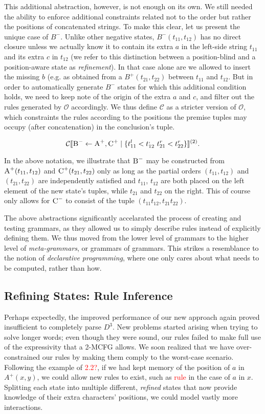 \documentclass[nonatbib,numbers,10pt]{sigplanconf}
\newcommand\todo[1]{\textcolor{red}{#1}}
\newcommand{\Order}[5]{
	\[
	\mathcal{#1}\llbracket #2 \leftarrow #3 \mid \{ #4 \} \rrbracket^{(#5)}.
	\]
}
\newcommand{\Con}[4]{\Order{C}{#1}{#2}{#3}{#4}}
\begin{document}
This additional abstraction, however, is not enough on its own. We still needed the ability to enforce additional constraints related not to the order but rather the positions of concatenated strings. To make this clear, let us present the unique case of $B^{-}$. Unlike other negative states, $B^{-}(t_{11},t_{12})$ has no direct closure unless we actually know it to contain its extra $a$ in the left-side string $t_{11}$ and its extra $c$ in $t_{12}$ (we refer to this distinction between a position-blind and a position-aware state as \textit{refinement}). In that case alone are we allowed to insert the missing $b$ (e.g. as obtained from a $B^{+}(t_{21},t_{22})$ between $t_{11}$ and $t_{12}$. But in order to automatically generate $B^{-}$ states for which this additional condition holds, we need to keep note of the origin of the extra $a$ and $c$, and filter out the rules generated by $\mathcal{O}$ accordingly. We thus define $\mathcal{C}$ as a stricter version of $\mathcal{O}$, which constraints the rules according to the positions the premise tuples may occupy (after concatenation) in the conclusion's tuple.
\Con{\textsc{B}^-}{\textsc{A}^+, \textsc{C}^+}{t_{11}^l < t_{12}^,\ t_{21}^r < t_{22}^r}{2}
In the above notation, we illustrate that $\textsc{B}^{-}$ may be constructed from $\textsc{A}^{+}(t_{11},t_{12})$ and $\textsc{C}^{+}(t_{21},t_{22})$ only as long as the partial orders $(t_{11},t_{12})$ and $(t_{21},t_{22})$ are independently satisfied and $t_{11}$, $t_{12}$ are both placed on the left element of the new state's tuples, while $t_{21}$ and $t_{22}$ on the right. This of course only allows for $\textsc{C}^{-}$ to consist of the tuple $(t_{11}t_{12}, t_{21}t_{22})$.

The above abstractions significantly accelarated the process of creating and testing grammars, as they allowed us to simply describe rules instead of explicitly defining them. We thus moved from the lower level of grammars to the higher level of \textit{meta-grammars}, or grammars of grammars. This strikes a resemblance to the notion of \textit{declarative programming}, where one only cares about what needs to be computed, rather than how.

\subsection{Refining States: Rule Inference}
Perhaps expectedly, the improved performance of our new approach again proved insufficient to completely parse $D^3$. New problems started arising when trying to solve longer words; even though they were sound, our rules failed to make full use of the expressivity that a 2-MCFG allows. We soon realized that we have over-constrained our rules by making them comply to the worst-case scenario. Following the example of \todo{2.2?}, if we had kept memory of the position of $a$ in $A^{+}(x,y)$, we could allow new rules to exist, such as \todo{rule} in the case of $a$ in $x$. Splitting each state into multiple different, \textit{refined} states that now provide knowledge of their extra characters' positions, we could model vastly more interactions.
\end{document}
